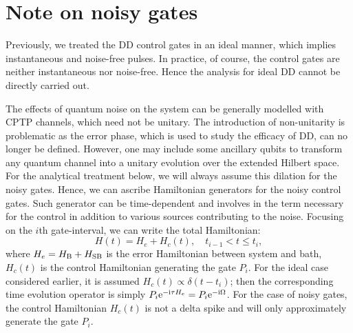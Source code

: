 \documentclass[b5paper,11pt]{article}
\begin{document}
\section{Note on noisy gates}
Previously, we treated the DD control gates in an ideal manner, which implies instantaneous and noise-free pulses. In practice, of course, the control gates are neither instantaneous nor noise-free. Hence the analysis for ideal DD cannot be directly carried out.

The effects of quantum noise on the system can be generally modelled with CPTP channels, which need not be unitary. The introduction of non-unitarity is problematic as the error phase, which is used to study the efficacy of DD, can no longer be defined.
However, one may include some ancillary qubits to transform any quantum channel into a unitary evolution over the extended Hilbert space. For the analytical treatment below, we will always assume this dilation for the noisy gates. Hence, we can ascribe Hamiltonian generators for the noisy control gates. 
Such generator can be time-dependent and involves in the term necessary for the control in addition to various sources contributing to the noise. 
Focusing on the $i$th gate-interval,  we can write the total Hamiltonian:
\begin{equation}\label{eq:noisy-Hamiltonian}
 H(t) = H_e + H_c(t), \quad t_{i-1}< t \le t_i,
\end{equation}
where $H_e=H_{\mathrm{B}}+H_{\mathrm{SB}}$ is the error Hamiltonian between system and bath, $H_c(t)$ is the control Hamiltonian generating the gate $P_i$.
For the ideal case considered earlier, it is assumed $H_c(t) \propto \delta(t-t_i)$; then the corresponding time evolution operator is simply $P_i \mathrm{e}^{-\mathrm{i} \tau H_e} =P_i \mathrm{e}^{-\mathrm{i} \Omega}$. For the case of noisy gates, the control Hamiltonian $H_c(t)$ is not a delta spike and will only approximately generate the gate $P_i$.
\end{document}

